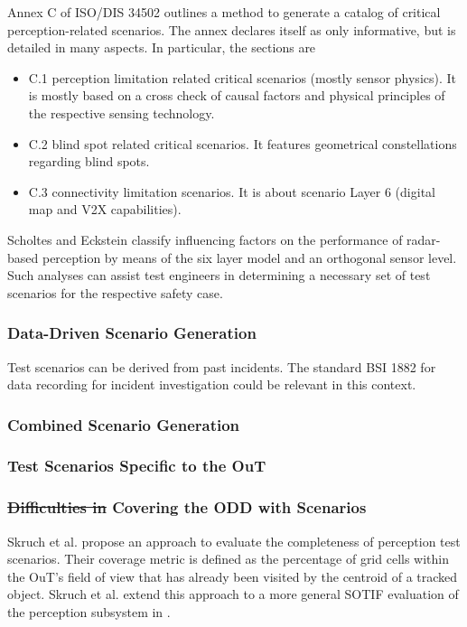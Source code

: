\documentclass[conference]{IEEEtran}
\newcommand{\citeold}[1]{{\hypersetup{citecolor=black}\cite{#1}}}
\newcommand{\new}[1]{{\color{my-red}#1}}
\begin{document}
Annex C of ISO/DIS 34502 \cite{ISO_DIS_34502_2021} outlines a method to generate a catalog of critical perception-related scenarios.
The annex declares itself as only informative, but is detailed in many aspects. 
In particular, the sections are 
\begin{itemize}
\item C.1 perception limitation related critical scenarios (mostly sensor physics). It is mostly based on a cross check of causal factors and physical principles of the respective sensing technology. 
\item C.2 blind spot related critical scenarios. It features geometrical constellations regarding blind spots.
\item C.3 connectivity limitation scenarios. It is about scenario Layer 6 (digital map and V2X capabilities).
\end{itemize}

Scholtes and Eckstein \cite{Scholtes2021systematic} classify  influencing factors on the performance of radar-based perception by means of the six layer model \citeold{Scholtes20216lmAccess} and an orthogonal sensor level. 
Such analyses can assist test engineers in determining a necessary set of test scenarios for the respective safety case. 


\subsubsection{Data-Driven Scenario Generation}
\label{sec:scenario_gen_data_driven}

Test scenarios can be derived from past incidents. 
The standard BSI 1882 \cite{BSI2021_pas1882} for data recording for incident investigation could be relevant in this context.

\subsubsection{Combined Scenario Generation}
\subsubsection{Test Scenarios Specific to the \new{OuT}}
\subsubsection{\sout{Difficulties in }Covering the ODD with Scenarios}

Skruch et al. \cite{Skruch2021completeness} propose an approach to evaluate the completeness of perception test scenarios.
Their coverage metric is defined as the percentage of grid cells within the OuT's field of view that has already been visited by the centroid of a tracked object. 
Skruch et al. extend this approach to a more general SOTIF evaluation of the perception subsystem in \cite{Skruch2022safety}.
\end{document}
